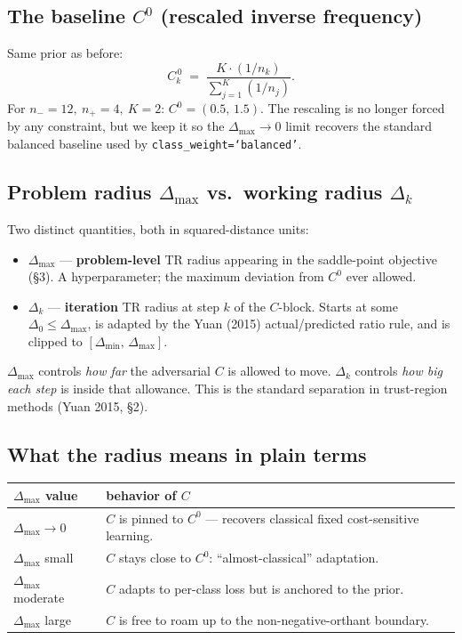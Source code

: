 \documentclass[11pt,a4paper]{article}
\begin{document}
\subsection{The baseline $C^0$ (rescaled inverse frequency)}

Same prior as before:
\[
C_k^{\,0} \;=\; \frac{K \cdot (1/n_k)}{\displaystyle\sum_{j=1}^{K}(1/n_j)}.
\]
For $n_- = 12,\ n_+ = 4,\ K = 2$: $C^0 = (0.5,\,1.5)$. The rescaling is no longer forced by any constraint, but we keep it so the $\Delta_{\max} \to 0$ limit recovers the standard balanced baseline used by \texttt{class\_weight=`balanced'}.

\subsection{Problem radius $\Delta_{\max}$ vs.\ working radius $\Delta_k$}

Two distinct quantities, both in squared-distance units:

\begin{itemize}[leftmargin=*,itemsep=2pt]
  \item $\Delta_{\max}$ --- \textbf{problem-level} TR radius appearing in the saddle-point objective (\S 3). A hyperparameter; the maximum deviation from $C^0$ ever allowed.
  \item $\Delta_k$ --- \textbf{iteration} TR radius at step $k$ of the $C$-block. Starts at some $\Delta_0 \le \Delta_{\max}$, is adapted by the Yuan (2015) actual/predicted ratio rule, and is clipped to $[\Delta_{\min},\,\Delta_{\max}]$.
\end{itemize}

$\Delta_{\max}$ controls \emph{how far} the adversarial $C$ is allowed to move. $\Delta_k$ controls \emph{how big each step} is inside that allowance. This is the standard separation in trust-region methods (Yuan 2015, \S 2).

\subsection{What the radius means in plain terms}

\begin{center}
\begin{tabular}{ll}
\toprule
\textbf{$\Delta_{\max}$ value} & \textbf{behavior of $C$} \\
\midrule
$\Delta_{\max} \to 0$ & $C$ is pinned to $C^0$ --- recovers classical fixed cost-sensitive learning. \\
$\Delta_{\max}$ small & $C$ stays close to $C^0$: ``almost-classical'' adaptation. \\
$\Delta_{\max}$ moderate & $C$ adapts to per-class loss but is anchored to the prior. \\
$\Delta_{\max}$ large & $C$ is free to roam up to the non-negative-orthant boundary. \\
\bottomrule
\end{tabular}
\end{center}
\end{document}
